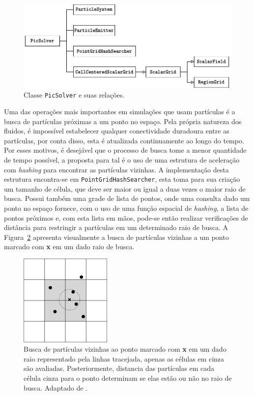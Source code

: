 \documentclass[12pt,a4paper,dvipsnames]{article}
\newcommand{\figref}[1]{Figura~\ref{#1}}
\begin{document}
\begin{figure}[ht]
    \centering
    \includegraphics[width=\textwidth]{PicSolver.pdf}
    \caption{Classe \texttt{PicSolver} e suas relações.}
    \label{fig:picsolver}
\end{figure}

Uma das operações mais importantes em simulações que usam partículas é a busca de partículas próximas a um ponto no espaço. Pela própria natureza dos fluidos, é impossível estabelecer qualquer conectividade duradoura entre as partículas, por conta disso, esta é atualizada continuamente ao longo do tempo. Por esses motivos, é desejável que o processo de busca tome a menor quantidade de tempo possível, a proposta para tal é o uso de uma estrutura de aceleração com \textit{hashing} para encontrar as partículas vizinhas. A implementação desta estrutura encontra-se em \texttt{PointGridHashSearcher}, esta toma para sua criação um tamanho de célula, que deve ser maior ou igual a duas vezes o maior raio de busca. Possui também uma grade de lista de pontos, onde uma consulta dado um ponto no espaço fornece, com o uso de uma função espacial de \textit{hashing}, a lista de pontos próximos e, com esta lista em mãos, pode-se então realizar verificações de distância para restringir a partículas em um determinado raio de busca. A \figref{fig:gridhashsearcher} apresenta visualmente a busca de partículas vizinhas a um ponto marcado com \textbf{x} em um dado raio de busca.

\begin{figure}[ht]
    \centering
    \includegraphics[width=0.4\textwidth]{PointGridHashSearcher.pdf}
    \caption{Busca de partículas vizinhas ao ponto marcado com \textbf{x} em um dado raio representado pela linhas tracejada, apenas as células em cinza são avaliadas. Posteriormente, distancia das partículas em cada célula cinza para o ponto determinam se elas estão ou não no raio de busca. Adaptado de \cite{kim_2017}.}
    \label{fig:gridhashsearcher}
\end{figure}
\end{document}
